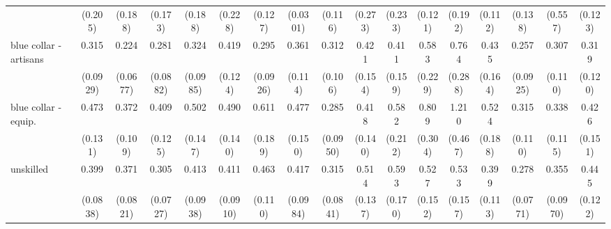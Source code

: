 {\begin{tabular}{l*{16}{c}}
                    &     (0.205)         &     (0.188)         &     (0.173)         &     (0.188)         &     (0.228)         &     (0.127)         &    (0.0301)         &     (0.116)         &     (0.273)         &     (0.233)         &     (0.121)         &     (0.192)         &     (0.112)         &     (0.138)         &     (0.557)         &     (0.123)         \\
[1em]
blue collar - artisans&       0.315\sym{***}&       0.224\sym{***}&       0.281\sym{***}&       0.324\sym{***}&       0.419\sym{**} &       0.295\sym{***}&       0.361\sym{**} &       0.312\sym{***}&       0.421\sym{*}  &       0.411\sym{*}  &       0.583         &       0.764         &       0.435\sym{*}  &       0.257\sym{***}&       0.307\sym{**} &       0.319\sym{**} \\
                    &    (0.0929)         &    (0.0677)         &    (0.0882)         &    (0.0985)         &     (0.124)         &    (0.0926)         &     (0.114)         &     (0.106)         &     (0.154)         &     (0.159)         &     (0.229)         &     (0.288)         &     (0.164)         &    (0.0925)         &     (0.110)         &     (0.120)         \\
[1em]
blue collar - equip.&       0.473\sym{**} &       0.372\sym{***}&       0.409\sym{**} &       0.502\sym{*}  &       0.490\sym{*}  &       0.611         &       0.477\sym{*}  &       0.285\sym{***}&       0.418\sym{**} &       0.582         &       0.809         &       1.210         &       0.524         &       0.315\sym{***}&       0.338\sym{**} &       0.426\sym{*}  \\
                    &     (0.131)         &     (0.109)         &     (0.125)         &     (0.147)         &     (0.140)         &     (0.189)         &     (0.150)         &    (0.0950)         &     (0.140)         &     (0.212)         &     (0.304)         &     (0.467)         &     (0.188)         &     (0.110)         &     (0.115)         &     (0.151)         \\
[1em]
unskilled           &       0.399\sym{***}&       0.371\sym{***}&       0.305\sym{***}&       0.413\sym{***}&       0.411\sym{***}&       0.463\sym{**} &       0.417\sym{***}&       0.315\sym{***}&       0.514\sym{*}  &       0.593         &       0.527\sym{*}  &       0.533\sym{*}  &       0.399\sym{**} &       0.278\sym{***}&       0.355\sym{***}&       0.445\sym{**} \\
                    &    (0.0838)         &    (0.0821)         &    (0.0727)         &    (0.0938)         &    (0.0910)         &     (0.110)         &    (0.0984)         &    (0.0841)         &     (0.137)         &     (0.170)         &     (0.152)         &     (0.157)         &     (0.113)         &    (0.0771)         &    (0.0970)         &     (0.122)         \\

\end{tabular}}
